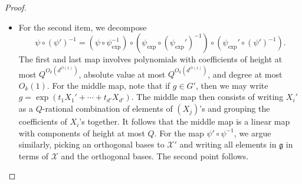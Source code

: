 \documentclass[11pt, a4paper]{amsart}
\theoremstyle{plain}
\theoremstyle{plain}
\theoremstyle{definition}
\theoremstyle{remark}
\numberwithin{equation}{section}
\numberwithin{lemma}{section}
\numberwithin{proposition}{section}
\numberwithin{corollary}{section}
\numberwithin{definition}{section}
\numberwithin{claim}{section}
\begin{document}
\begin{proof}
\begin{itemize}
\begin{align*}
\end{align*}
Here, we see that each coefficient of each polynomial has height at most $Q^{O_k(1)}$, and has degree $O_k(1)$. This uses that the nesting of $P_j$'s has depth at most $k$; this completes the proof of the first item.
\item For the second item, we decompose
$$\psi \circ (\psi')^{-1} = (\psi \circ \psi_{\exp}^{-1}) \circ (\psi_{\exp} \circ (\psi_{\exp}')^{-1}) \circ (\psi_{\exp}' \circ (\psi')^{-1}).$$
The first and last map involves polynomials with coefficients of height at most $Q^{O_k(d^{O(1)})}$, absolute value at most $Q^{O_k(d^{O(1)})}$, and degree at most $O_k(1)$. For the middle map, note that if $g \in G'$, then we may write $g = \exp(t_1X_1' + \cdots + t_{d'} X_{d'})$. The middle map then consists of writing $X_i'$ as a $Q$-rational combination of elements of $(X_j)$'s and grouping the coefficients of $X_i$'s together. It follows that the middle map is a linear map with components of height at most $Q$. For the map $\psi' \circ \psi^{-1}$, we argue similarly, picking an orthogonal bases to $\mathcal{X}'$ and writing all elements in $\mathfrak{g}$ in terms of $\mathcal{X}$ and the orthogonal bases. The second point follows.
\end{itemize}
\end{proof}
\end{document}
